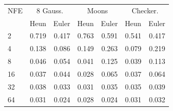 \begin{tabular}{lrrrrrr}
\toprule
NFE & \multicolumn{2}{c}{8 Gauss.} & \multicolumn{2}{c}{Moons} & \multicolumn{2}{c}{Checker.} \\
 & Heun & Euler & Heun & Euler & Heun & Euler \\
\midrule
2 & 0.719 & 0.417 & 0.763 & 0.591 & 0.541 & 0.417 \\
4 & 0.138 & 0.086 & 0.149 & 0.263 & 0.079 & 0.219 \\
8 & 0.046 & 0.054 & 0.041 & 0.125 & 0.039 & 0.113 \\
16 & 0.037 & 0.044 & 0.028 & 0.065 & 0.037 & 0.064 \\
32 & 0.038 & 0.033 & 0.031 & 0.035 & 0.035 & 0.039 \\
64 & 0.031 & 0.024 & 0.028 & 0.024 & 0.031 & 0.032 \\
\bottomrule
\end{tabular}
